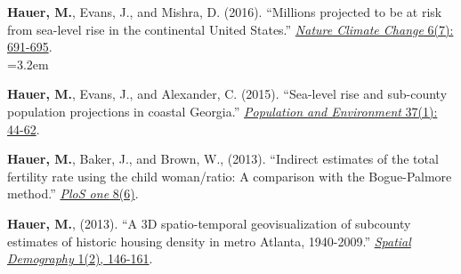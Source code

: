 \begin{etaremune}
\item \textbf{Hauer, M.}, Evans, J., and Mishra, D. (2016). ``Millions projected to be at risk from sea-level rise in the continental United States.'' \href{http://www.nature.com/nclimate/journal/v6/n7/full/nclimate2961.html}{\textit{Nature Climate Change} 6(7): 691-695}.\\
            \hangindent=3.2em
                
\item \textbf{Hauer, M.}, Evans, J., and Alexander, C. (2015). ``Sea-level rise and sub-county population projections in coastal Georgia.''  \href{http://link.springer.com/article/10.1007/s11111-015-0233-8}{\textit{Population and Environment} 37(1): 44-62}.\\      

\item \textbf{Hauer, M.}, Baker, J., and Brown, W., (2013). ``Indirect estimates of the total fertility rate using the child                        woman/ratio: A comparison with the Bogue-Palmore method.'' \href{http://journals.plos.org/plosone/article?id=10.1371/journal.pone.0067226}{\textit{PloS one} 8(6)}.\\

\item \textbf{Hauer, M.}, (2013). ``A 3D spatio-temporal geovisualization of subcounty estimates of historic housing density in metro Atlanta, 1940-2009.'' \href{http://link.springer.com/article/10.1007/BF03354895}{\textit{Spatial Demography} 1(2), 146-161}.\\

 \end{etaremune}


